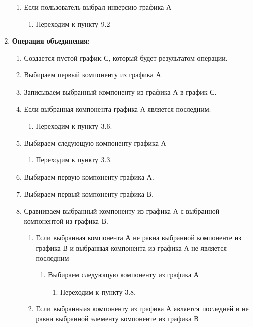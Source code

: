 \documentclass[a4paper,12pt]{extarticle}
\begin{document}
\begin{enumerate}
\begin{enumerate}[label*=\arabic*.]
        \item Если пользователь выбрал инверсию графика А
    \begin{enumerate}[label*=\arabic*.]
      \item Переходим к пункту 9.2
    \end{enumerate}
  \end{enumerate}
  \item \textbf{Операция объединения}:
  \begin{enumerate}[label*=\arabic*.]
    \item Создается пустой график С, который будет результатом операции.
    \item Выбираем первый компоненту из графика А.
    \item Записываем выбранный компоненту из графика А в график С.
    \item Если выбранная компонента графика А является последним:
    \begin{enumerate}[label*=\arabic*.]
      \item Переходим к пункту 3.6.
    \end{enumerate}
    \item Выбираем следующую компоненту графика А
    \begin{enumerate}[label*=\arabic*.]
      \item Переходим к пункту 3.3.
    \end{enumerate}
    \item Выбираем первую компоненту графика А.
    \item Выбираем первый компоненту графика В.
    \item Сравниваем выбранный компоненту из графика А с выбранной компонентой из графика В.
    \begin{enumerate}[label*=\arabic*.]
      \item Если выбранная компонента А не равна выбранной компоненте из графика В и выбранная компонента из графика А не является последним
      \begin{enumerate}[label*=\arabic*.]
        \item Выбираем следующую компоненту из графика А
        \begin{enumerate}[label*=\arabic*.]
          \item Переходим к пункту 3.8.
        \end{enumerate}
      \end{enumerate}
      \item Если выбранныая компоненту из графика А является последней и не равна выбранной элементу компоненте из графика В

\end{enumerate}
\end{enumerate}
\end{enumerate}
\end{document}
